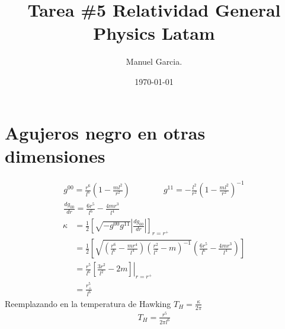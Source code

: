 \documentclass{article}
\title{Tarea \#5 Relatividad General Physics Latam }
\author{Manuel Garcia.}
\date{\today}
\begin{document}
\maketitle

\section{Agujeros negro en otras dimensiones }
\begin{gather}
  g^{00} = \frac{r ^ {6 }}{l ^ {6 }} \left(1 - \frac{ml^2 }{r^2 }\right) \qquad \qquad 
  g ^ {11 } = -\frac{l^2 }{r^2 }\left(1 - \frac{ml^2 }{r^2 }\right)^ {-1 } \\ 
  \frac{d g _{00 }  }{d r} = \frac{6r^5 }{l^6 } - \frac{4mr^3 }{l^4}
\end{gather}
\begin{align*}
  \kappa &= \frac{1}{2} \left[\sqrt{-g ^ {00 } g ^ {11 }}  \left|\frac{d g _{00 }  }{d r}\right| \right] _{r = r^+} \\
         &= \frac{1}{2} \left[\sqrt{\left(\frac{r^6 }{l^6 } - \frac{mr^4 }{l^4 }\right) \left(\frac{r^2 }{l^2 } - m\right)^ {-1}} \left(\frac{6r^5 }{l^6 } - \frac{4mr^3 }{l^4}\right) \right] \\
         &= \left. \frac{r^5 }{l^6 }\left[\frac{3r^2 }{l^2 } - 2m\right] \right|_{r= r^+}  \\
         &= \frac{r_+^5 }{l^6 }
\end{align*}
Reemplazando en la temperatura de Hawking $ T_H = \frac{\kappa}{2\pi } $
\begin{gather*}
  T_H = \frac{r^5 }{2\pi l^6 } 
\end{gather*}
\end{document}
